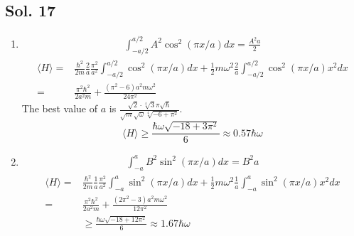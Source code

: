 \subsection*{Sol. 17}
\begin{enumerate}
    \item 
    \begin{align*}
    \int_{-a/2}^{a/2} A^2\cos^2(\pi x/a)dx = \frac{A^2a}{2}
\end{align*}
\begin{align*}
    \langle H \rangle
    =&
    \frac{\hbar^2}{2m}
    \frac{2}{a}\frac{\pi^2}{a^2}
    \int_{-a/2}^{a/2}
    \cos^2(\pi x/a)dx
    +\frac{1}{2}m\omega^2
    \frac{2}{a}
    \int_{-a/2}^{a/2}
    \cos^2(\pi x/a)x^2dx\\
=&\frac{\pi^{2} \hbar^{2}}{2a^{2} m}
+\frac{\left(\pi^{2} - 6\right) a^{2} m{\omega}^{2}}{24\pi^{2}}
\end{align*}
The best value of $a$ is $\frac{\sqrt{2} \cdot \sqrt[4]{3} \pi \sqrt{\hbar}}{\sqrt{m} \sqrt{\omega} \sqrt[4]{-6 + \pi^{2}}}.$
$$
\langle H\rangle\geq \frac{\hbar \omega \sqrt{-18 + 3 \pi^{2}}}{6}\approx0.57\hbar\omega
$$
\item \begin{align*}
    \int_{-a}^a B^2\sin^2(\pi x/a)dx=B^2a
\end{align*}
\begin{align*}
    \langle H\rangle
    =&\frac{\hbar^2}{2m}\frac{1}{a}
    \frac{\pi^2}{a^2}
    \int_{-a}^a
    \sin^2(\pi x/a)dx
    +\frac{1}{2}m\omega^2 
    \frac{1}{a}
    \int_{-a}^a
    \sin^2(\pi x/a)x^2dx\\
    =&\frac{\pi^2 \hbar^{2}}{2a^{2} m}
    +\frac{\left(2\pi^{2} - 3\right) a^{2} m{\omega^2}}{12\pi^{2}}\\
    &\geq  \frac{\hbar \omega \sqrt{-18 + 12 \pi^{2}}}{6}\approx 1.67\hbar\omega
\end{align*}
\end{enumerate}


